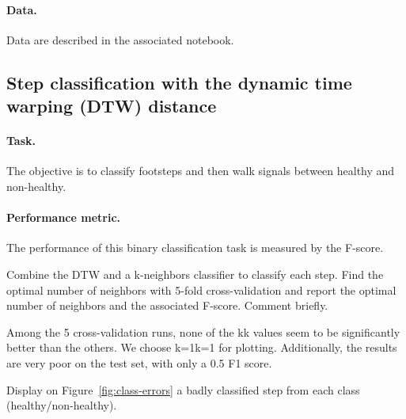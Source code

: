\documentclass[11pt]{article}
\begin{document}
\paragraph{Data.}
Data are described in the associated notebook.

\subsection{Step classification with the dynamic time warping (DTW) distance}

\paragraph{Task.} The objective is to classify footsteps and then walk signals between healthy and non-healthy.

\paragraph{Performance metric.} The performance of this binary classification task is measured by the F-score.


\begin{exercise}
Combine the DTW and a k-neighbors classifier to classify each step. Find the optimal number of neighbors with 5-fold cross-validation and report the optimal number of neighbors and the associated F-score. Comment briefly.
\end{exercise}

\begin{solution}
Among the 5 cross-validation runs, none of the kk values seem to be significantly better than the others. We choose k=1k=1 for plotting. Additionally, the results are very poor on the test set, with only a 0.5 F1 score.
\end{solution}

\newpage
\begin{exercise}\label{q:class-errors}
Display on Figure~\ref{fig:class-errors} a badly classified step from each class (healthy/non-healthy).
\end{exercise}
\end{document}
